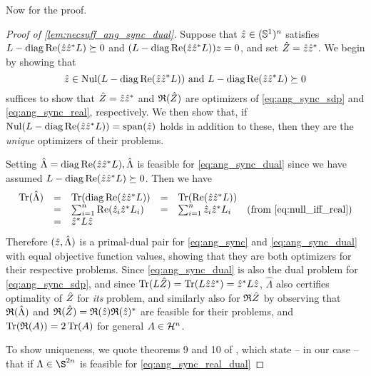   Now for the proof.

\begin{proof}[Proof of \cref{lem:necsuff_ang_sync_dual}]
  Suppose that $\hat{z} \in (\mathbb{S}^1)^n$ satisfies $L - \operatorname{diag} \operatorname{Re}(\hat{z} \hat{z}^* L) \succeq 0$ and $(L - \operatorname{diag} \operatorname{Re}(\hat{z} \hat{z}^* L))z = 0$, and set $\hat{Z} = \hat{z} \hat{z}^*$.  We begin by showing that \[\hat{z} \in \operatorname{Nul}(L -  \operatorname{diag} \operatorname{Re}(\hat{z} \hat{z}^* L)) \ \text{and} \ L - \operatorname{diag} \operatorname{Re}(\hat{z} \hat{z}^* L) \succeq 0 \] suffices to show that $\hat{Z} = \hat{z} \hat{z}^*$ and $\mathfrak{R}(\hat{Z})$ are optimizers of \eqref{eq:ang_sync_sdp} and \eqref{eq:ang_sync_real}, respectively.  We then show that, if $\operatorname{Nul}(L -  \operatorname{diag} \operatorname{Re}(\hat{z} \hat{z}^* L)) = \operatorname{span}(\hat{z})$ holds in addition to these, then they are the \emph{unique} optimizers of their problems.

  Setting $\hat{\Lambda} = \operatorname{diag} \operatorname{Re}(\hat{z} \hat{z}^* L), \hat{\Lambda}$ is feasible for \eqref{eq:ang_sync_dual} since we have assumed $L - \operatorname{diag} \operatorname{Re}(\hat{z} \hat{z}^* L) \succeq 0$.  Then we have
  \[
  \begin{array}{rclcll}
    \operatorname{Tr}(\hat{\Lambda}) & = & \operatorname{Tr}(\operatorname{diag}\operatorname{Re}(\hat{z} \hat{z}^* L))& = & \operatorname{Tr}(\operatorname{Re}(\hat{z} \hat{z}^* L)) \\
    & = & \sum_{i = 1}^n \operatorname{Re}(\hat{z}_i \hat{z}^* L_i) & = & \sum_{i = 1}^n \hat{z}_i \hat{z}^* L_i & \text{(from \eqref{eq:null_iff_real})} \\
    & = & \hat{z}^* L \hat{z}
  \end{array}
  \]
  Therefore $(\hat{z}, \hat{\Lambda})$ is a primal-dual pair for \eqref{eq:ang_sync} and \eqref{eq:ang_sync_dual} with equal objective function values, showing that they are both optimizers for their respective problems.  Since \eqref{eq:ang_sync_dual} is also the dual problem for \eqref{eq:ang_sync_sdp}, and since $\operatorname{Tr}(L \hat{Z}) = \operatorname{Tr}(L \hat{z} \hat{z}^*) = \hat{z}^* L \hat{z}$, $\hat{\Lambda}$ also certifies optimality of $\hat{Z}$ for \emph{its} problem, and similarly also for $\mathfrak{R}{\hat{Z}}$ by observing that $\mathfrak{R}(\hat{\Lambda})$ and $\mathfrak{R}(\hat{Z}) = \mathfrak{R}(\hat{z}) \mathfrak{R}(\hat{z})^*$ are feasible for their problems, and $\operatorname{Tr}(\mathfrak{R}(A)) = 2 \operatorname{Tr}(A)$ for general $A \in \mathcal{H}^n$.

  To show uniqueness, we quote theorems 9 and 10 of \cite{alizadeh1997nondegeneracy}, which state -- in our case -- that if $\Lambda \in \S^{2n}$ is feasible for \eqref{eq:ang_sync_real_dual}

\end{proof}
